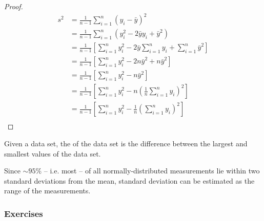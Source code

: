 \begin{proof}
    \begin{align*}
        s^{2} &= \frac{1}{n-1} \sum_{i=1}^{n} (y_{i} - \bar{y})^{2}\\
              &= \frac{1}{n-1} \sum_{i=1}^{n} (y_{i}^{2} -2\bar{y} y_{i} + \bar{y}^{2})\\
              &= \frac{1}{n-1} \left[\sum_{i=1}^{n} y_{i}^{2} -2\bar{y} \sum_{i=1}^{n} y_{i} + \sum_{i=1}^{n} \bar{y}^{2}\right]\\
              &= \frac{1}{n-1} \left[\sum_{i=1}^{n} y_{i}^{2} -2n\bar{y}^{2} + n\bar{y}^{2}\right]\\
              &= \frac{1}{n-1} \left[\sum_{i=1}^{n} y_{i}^{2} -n\bar{y}^{2}\right]\\
              &= \frac{1}{n-1} \left[\sum_{i=1}^{n} y_{i}^{2} -n\left(\frac{1}{n} \sum_{i=1}^{n} y_{i}\right)^{2}\right]\\
              &= \frac{1}{n-1} \left[\sum_{i=1}^{n} y_{i}^{2} -\frac{1}{n}\left(\sum_{i=1}^{n} y_{i}\right)^{2}\right]\\    
    \end{align*}
\end{proof}

\begin{defn}
    Given a data set, the  of the data set is the difference between the largest and smallest values of the data set. 
\end{defn}

\begin{note}
    Since $\sim 95\%$ -- i.e. most -- of all normally-distributed measurements lie within two standard deviations from the mean, standard deviation can be estimated as  the range of the measurements.
\end{note}

\subsubsection{Exercises}

